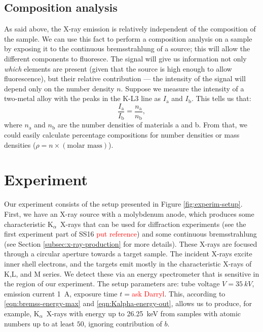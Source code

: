 \documentclass[11pt,a4paper,twoside,onecolumn]{article}
\newcommand{\reminder}[1]{\textcolor{red}{#1}}
\newcommand{\Kalpha}{$\mathrm{K}_\alpha$~}
\begin{document}
\subsection{Composition analysis}
As said above, the X-ray emission is relatively independent of the composition of the sample. We can use this fact to perform a composition analysis on a sample by exposing it to the continuous bremsstrahlung of a source; this will allow the different components to fluoresce. The signal will give us information not only \emph{which} elements are present (given that the source is high enough to allow fluorescence), but their relative contribution --- the intensity of the signal will depend only on the number density $n$. Suppose we measure the intensity of a two-metal alloy with the peaks in the K-L3 line as $I_\mathrm{a}$ and $I_\mathrm{b}$.
This tells us that:
\begin{equation}
    \frac{I_\mathrm{a}}{I_\mathrm{b}} = \frac{n_\mathrm{a}}{n_\mathrm{b}},
\end{equation}
where $n_\mathrm{a}$ and $n_\mathrm{b}$ are the number densities of materials a and b. From that, we could easily calculate percentage compositions for number densities or mass densities ($\rho = n \times (\text{molar mass})$).

\section{Experiment}\label{sec:experiment}
Our experiment consists of the setup presented in Figure \ref{fig:experim-setup}. First, we have an X-ray source with a molybdenum anode, which produces some characteristic \Kalpha X-rays that can be used for diffraction experiments (see the first experiment part of SS16 \reminder{put reference}) and some continuous bremsstrahlung (see Section \ref{subsec:x-ray-production} for more details). These X-rays are focused through a circular aperture towards a target sample. The incident X-rays excite inner shell electrons, and the targets emit mostly in the characteristic X-rays of K,L, and M series. We detect these via an energy spectrometer that is sensitive in the region of our experiment. The setup parameters are: tube voltage $V = \qty{35}{kV}$, emission current \qty{1}{A}, exposure time $t=$\reminder{ask Darryl}. This, according to \eqref{eqn:bremss-energy-max} and \eqref{eqn:Kalpha-energy-out}, allows us to produce, for example, \Kalpha X-rays with energy up to \qty{26.25}{keV} from samples with atomic numbers up to at least $50$, ignoring contribution of $b$.
\end{document}
